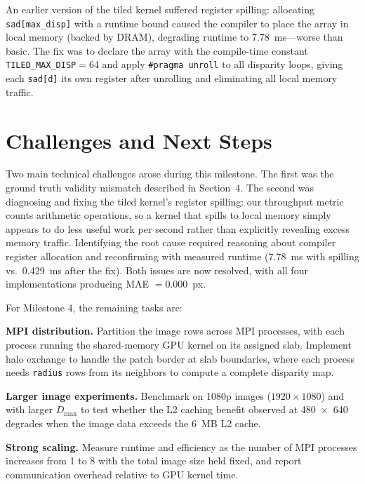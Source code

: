 \documentclass[11pt]{article}
\begin{document}
An earlier version of the tiled kernel suffered register spilling: allocating \texttt{sad[max\_disp]}
with a runtime bound caused the compiler to place the array in local memory (backed by DRAM),
degrading runtime to 7.78~ms---worse than basic. The fix was to declare the array with the
compile-time constant \texttt{TILED\_MAX\_DISP}$=$64 and apply \texttt{\#pragma unroll} to all
disparity loops, giving each \texttt{sad[d]} its own register after unrolling and eliminating
all local memory traffic.

\section{Challenges and Next Steps}

Two main technical challenges arose during this milestone. The first was the ground truth
validity mismatch described in Section~4. The second was diagnosing and fixing the tiled
kernel's register spilling: our throughput metric counts arithmetic operations, so a kernel
that spills to local memory simply appears to do less useful work per second rather than
explicitly revealing excess memory traffic. Identifying the root cause required reasoning
about compiler register allocation and reconfirming with measured runtime (7.78~ms with
spilling vs.\ 0.429~ms after the fix). Both issues are now resolved, with all four
implementations producing MAE $= 0.000$~px.

For Milestone 4, the remaining tasks are:

\textbf{MPI distribution.} Partition the image rows across MPI processes, with each process
running the shared-memory GPU kernel on its assigned slab. Implement halo exchange to handle
the patch border at slab boundaries, where each process needs \texttt{radius} rows from its
neighbors to compute a complete disparity map.

\textbf{Larger image experiments.} Benchmark on 1080p images ($1920 \times 1080$) and with
larger $D_{\max}$ to test whether the L2 caching benefit observed at 480~$\times$~640
degrades when the image data exceeds the 6~MB L2 cache.

\textbf{Strong scaling.} Measure runtime and efficiency as the number of MPI processes increases
from 1 to 8 with the total image size held fixed, and report communication overhead relative
to GPU kernel time.

\newpage


\end{document}
